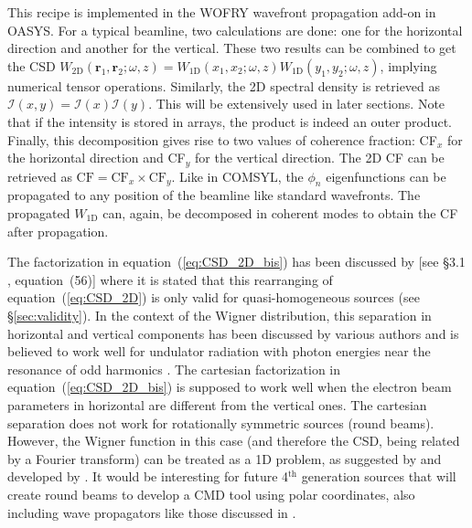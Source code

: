 \documentclass{iucr}
\begin{document}
This recipe is implemented in the WOFRY wavefront propagation add-on in OASYS. For a typical beamline, two calculations are done: one for the horizontal direction and another for the vertical. These two results can be combined to get the CSD $W_\text{2D}(\textbf{r}_1,\textbf{r}_2;\omega,z)=W_\text{1D}(x_1,x_2;\omega,z) W_\text{1D}(y_1,y_2;\omega,z)$, implying numerical tensor operations. Similarly, the 2D spectral density is retrieved as $\mathcal{I}(x,y)=\mathcal{I}(x) \mathcal{I}(y)$. This will be extensively used in later sections. Note that if the intensity is stored in arrays, the product is indeed an outer product. Finally, this decomposition gives rise to two values of coherence fraction: CF$_x$ for the horizontal direction and CF$_y$ for the vertical direction. The 2D CF can be retrieved as $\text{CF}=\text{CF}_{x} \times \text{CF}_{y}$. Like in COMSYL, the $\phi_n$ eigenfunctions can be propagated to any position of the beamline like standard wavefronts.
The propagated $W_\text{1D}$ can, again, be decomposed in coherent modes to obtain the CF after propagation. 

The factorization in equation~(\ref{eq:CSD_2D_bis}) has been discussed by  [see §3.1 , equation~(56)] where it is stated that this rearranging of equation~(\ref{eq:CSD_2D}) is only valid for quasi-homogeneous sources (see \S\ref{sec:validity}). In the context of the Wigner distribution, this separation in horizontal and vertical components has been discussed by various authors and is believed to work well for undulator radiation with photon energies near the resonance of odd
harmonics \cite{Bazarov2012,tanaka2014,nash2021}. 
The cartesian factorization in equation~(\ref{eq:CSD_2D_bis}) is supposed to work well when the electron beam parameters in horizontal are different from the vertical ones. The cartesian separation does not work for rotationally symmetric sources (round beams). However, the Wigner function in this case (and therefore the CSD, being related by a Fourier transform) can be treated as a 1D problem, as suggested by  and developed by . It would be interesting for future 4$^\text{th}$ generation sources that will create round beams to develop a CMD tool using polar coordinates, also including wave propagators like those discussed in \cite{LiJacobsen}. 
\end{document}
